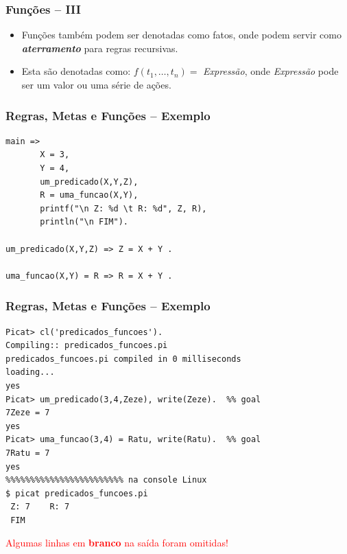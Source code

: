 \begin{frame}[fragile]
	\frametitle{Funções  -- III}
    
    \begin{itemize}
    
        \item Funções também podem ser denotadas como fatos, onde podem servir como 
        \textbf{\textit{aterramento}} para regras recursivas.
        
        
        \item Esta são denotadas como: $f(t_1,\ldots,t_n) = $ \emph{Expressão}, onde \textit{Expressão}
        pode ser um valor ou uma série de ações.
        
    \end{itemize}
    
\end{frame}

\begin{frame}[fragile]
\frametitle{Regras, Metas e Funções -- Exemplo}

\begin{small}
\begin{verbatim}
main =>
       X = 3, 
       Y = 4,
       um_predicado(X,Y,Z),
       R = uma_funcao(X,Y),
       printf("\n Z: %d \t R: %d", Z, R),
       println("\n FIM"). 
       
um_predicado(X,Y,Z) => Z = X + Y .

uma_funcao(X,Y) = R => R = X + Y .
\end{verbatim}
\end{small}
\end{frame}


\begin{frame} [fragile]

\frametitle{Regras, Metas e Funções -- Exemplo}
\begin{footnotesize}
\begin{verbatim}
Picat> cl('predicados_funcoes').
Compiling:: predicados_funcoes.pi
predicados_funcoes.pi compiled in 0 milliseconds
loading...
yes
Picat> um_predicado(3,4,Zeze), write(Zeze).  %% goal
7Zeze = 7
yes
Picat> uma_funcao(3,4) = Ratu, write(Ratu).  %% goal
7Ratu = 7
yes
%%%%%%%%%%%%%%%%%%%%%%%% na console Linux
$ picat predicados_funcoes.pi 
 Z: 7 	 R: 7
 FIM
\end{verbatim}
\end{footnotesize}
{\small \textcolor{red}{Algumas linhas em \textbf{branco} na saída foram omitidas!}}
\end{frame}


